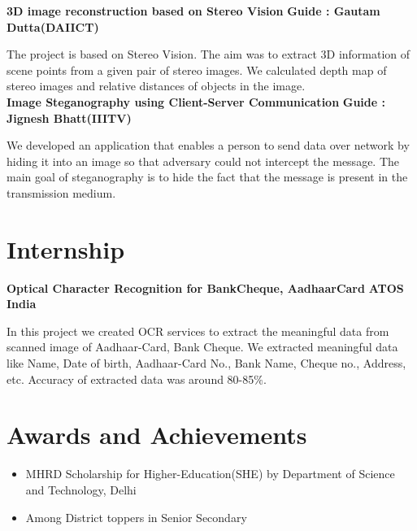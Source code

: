 \documentclass{article}
\begin{document}
\vspace*{2mm}
\textbf{\large{3D image reconstruction based on Stereo Vision}} \hspace*{3.1cm} \textbf{Guide : Gautam Dutta(DAIICT)}

\vspace*{.031mm}
\hspace*{2.6mm} The project is based on Stereo Vision. The aim was to extract 3D information of scene points from a given pair of stereo images. We calculated depth map of stereo images and relative distances of objects in the image.\\

\vspace*{2mm}
\textbf{\large{Image Steganography using Client-Server Communication}} \hspace*{1.5cm} \textbf{Guide : Jignesh Bhatt(IIITV)}

\vspace*{.031mm}
\hspace*{2.6mm} We developed an application that enables a person to send data over network by hiding it into an image so that adversary could not intercept the message. The main goal of steganography is to hide the fact that the message is present in the transmission medium.

\vspace*{5mm}
\section{Internship}
\vspace*{2mm}
\textbf{\large{Optical Character Recognition for BankCheque, AadhaarCard}} \hspace*{4cm} \textbf{ATOS India}

\vspace*{.051mm}
\hspace*{2.6mm} In this project we created OCR services to extract the meaningful data from scanned image of Aadhaar-Card, Bank Cheque. We extracted meaningful data like Name, Date of birth, Aadhaar-Card No., Bank Name, Cheque no., Address, etc. Accuracy of extracted data was around 80-85$\%.$%

\vspace*{.3cm}
\section{Awards and Achievements}
\vspace*{2mm}
\begin{itemize}
\item MHRD Scholarship for Higher-Education(SHE) by Department of Science and Technology, Delhi
\item Among District toppers in Senior Secondary
\end{itemize}
\end{document}

